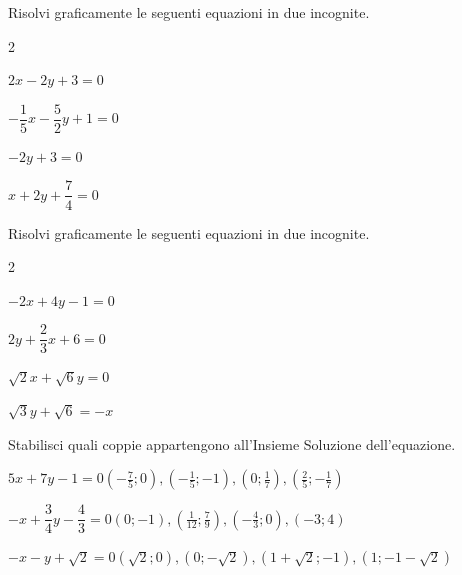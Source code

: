 \begin{esercizio}
 \label{ese:22.4}
Risolvi graficamente le seguenti equazioni in due incognite.
\begin{htmulticols}{2}
 \begin{enumeratea}
\spazielenx
\item \(2x-2y+3=0\)
\item \(-{\dfrac{1}{5}}x-\dfrac{5}{2}y+1=0\)
\item \(-2y+3=0\)
\item \(x+2y+\dfrac{7}{4}=0\)
\end{enumeratea}
\end{htmulticols}
\end{esercizio}

\begin{esercizio}
 \label{ese:22.5}
Risolvi graficamente le seguenti equazioni in due incognite.
\begin{htmulticols}{2}
 \begin{enumeratea}
\spazielenx
\item \(-2x+4y-1=0\)
\item \(2y+\dfrac{2}{3}x+6=0\)
\item \(\sqrt{2}x+\sqrt{6}y=0\)
\item \(\sqrt{3}y+\sqrt{6}=-x\)
 \end{enumeratea}
\end{htmulticols}
\end{esercizio}

\begin{esercizio}
 \label{ese:22.6}
 Stabilisci quali coppie appartengono all'Insieme Soluzione dell'equazione.
\TabPositions{4cm}

\medskip
\begin{enumeratea}
\item \(5x+7y-1=0\)\tab\(\left(-\frac{7}{5};0\right), 
\left(-\frac{1}{5};-1\right), \left(0;\frac{1}{7}\right), 
\left(\frac{2}{5};-\frac{1}{7}\right)\)
\item \(-x+\dfrac{3}{4}y-\dfrac{4}{3}=0\)\tab\((0;-1), 
\left(\frac{1}{12};\frac{7}{9}\right), 
\left(-\frac{4}{3};0\right), (-3;4)\)
\item \(-x-y+\sqrt{2}=0\)\tab\(\left(\sqrt{2};0\right), 
\left(0;-\sqrt{2}\right), \left(1+\sqrt{2};-1\right), 
\left(1;-1-\sqrt{2}\right)\)
\end{enumeratea}
\end{esercizio}


